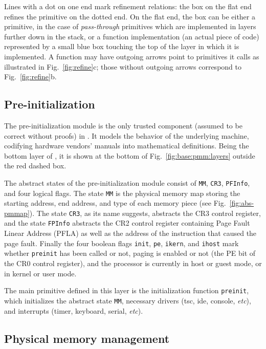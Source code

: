 Lines with a dot on one end mark refinement relations: the box on the
flat end refines the primitive on the dotted end. On the flat end, the
box can be either a primitive, in the case of \emph{pass-through}
primitives which are implemented in layers further down in the stack,
or a function implementation (an actual piece of code) represented by
a small blue box touching the top of the layer in which it is
implemented.  A function may have outgoing arrows point to primitives
it calls as illustrated in Fig.\ \ref{fig:refine}c; those without
outgoing arrows correspond to Fig.\ \ref{fig:refine}b.

\subsection{Pre-initialization}
\label{sec:base:preinit}

The pre-initialization module is the only trusted component
(assumed to be correct without proofs) in \mCTOSbase{}.
It models the behavior of the underlying machine,
codifying hardware vendors' manuals into mathematical definitions.
Being the bottom layer of \mCTOSbase{},
it is shown at the bottom of Fig.\ \ref{fig:base:pmm:layers} outside the red dashed box.

The abstract states of the pre-initialization module consist of
\verb"MM", \verb"CR3", \verb"PFInfo", and four logical flags.  The
state \verb"MM" is the physical memory map storing the starting
address, end address, and type of each memory piece (see
Fig.\ \ref{fig:abs-pmmap}).  The state \verb"CR3", as its name
suggests, abstracts the CR3 control register, and the state
\verb"FPInfo" abstracts the CR2 control register containing Page Fault
Linear Address (PFLA) as well as the address of the instruction that caused
the page fault.  Finally the four boolean flags \verb"init",
\verb"pe", \verb"ikern", and \verb"ihost" mark whether \verb"preinit"
has been called or not, paging is enabled or not (the PE bit of the
CR0 control register), and the processor is currently in host or guest mode,
or in kernel or user mode.

The main primitive defined in this layer is the initialization function \verb"preinit",
which initializes the abstract state \verb"MM", necessary drivers (tsc, ide, console, {\it etc}),
and interrupts (timer, keyboard, serial, {\it etc}).

\subsection{Physical memory management}
\label{sec:base:pmm} 

